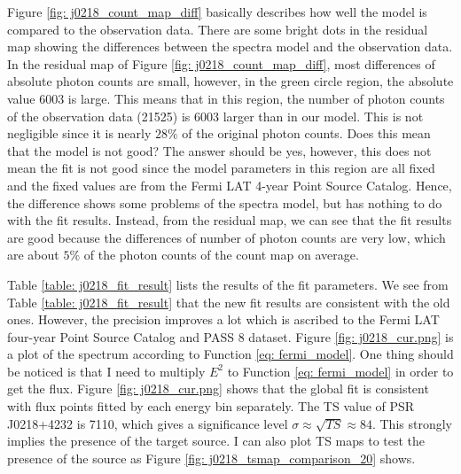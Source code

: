 \documentclass[12pt]{report}
\newcommand{\fgl}[0]{
  Fermi LAT four-year Point Source Catalog
}
\begin{document}
      Figure \ref{fig: j0218_count_map_diff} basically describes how well the model is 
      compared to the observation data. There are some bright dots in 
      the residual map showing the differences between the spectra model and the 
      observation data. In the residual map of Figure \ref{fig: j0218_count_map_diff}, 
      most differences of absolute photon counts are small, however, in the green 
      circle region, the absolute value 6003 is large. This means that in this region,
      the number of photon counts of the observation data (21525) is 6003 larger than 
      in our model. This is not negligible since it is nearly $28\%$ of the original 
      photon counts. Does this mean that the model is not good? The answer should be 
      yes, however, this does not mean the fit is not good since the model parameters 
      in this region are all fixed and the fixed values are from the Fermi LAT 4-year 
      Point Source Catalog. Hence, the difference shows some problems of the spectra 
      model, but has nothing to do with the fit results. Instead, from the residual map, 
      we can see that the fit results are good because the differences
      of number of photon counts are very low, which are about $5\%$ of the photon 
      counts of the count map on average.

      Table \ref{table: j0218_fit_result} lists the results of the fit parameters. 
      We see from Table \ref{table: j0218_fit_result} that the new fit results are 
      consistent with the old ones. However, the precision improves a lot which is 
      ascribed to the \fgl{} and PASS 8 dataset. Figure \ref{fig: j0218_cur.png} is a 
      plot of the spectrum according to Function \ref{eq: fermi_model}.
      One thing should be noticed is that I need to multiply $E^2$ to Function 
      \ref{eq: fermi_model} 
      in order to get the flux. Figure \ref{fig: j0218_cur.png} shows that 
      the global fit is consistent with flux points fitted by each energy bin separately. 
      The TS value of PSR J0218+4232 is 7110, which gives 
      a significance level $\sigma \approx \sqrt{TS} \approx 84$. This strongly implies the 
      presence of the target source. I can also plot TS maps to test the presence of the 
      source as Figure \ref{fig: j0218_tsmap_comparison_20} shows. 
            
\end{document}
